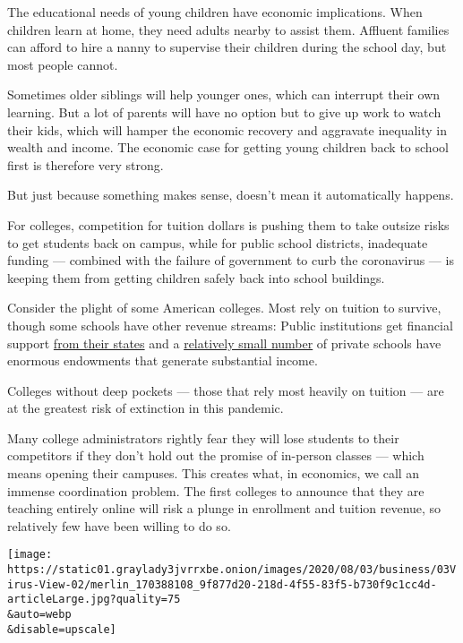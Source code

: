 The educational needs of young children have economic implications. When
children learn at home, they need adults nearby to assist them. Affluent
families can afford to hire a nanny to supervise their children during
the school day, but most people cannot.

Sometimes older siblings will help younger ones, which can interrupt
their own learning. But a lot of parents will have no option but to give
up work to watch their kids, which will hamper the economic recovery and
aggravate inequality in wealth and income. The economic case for getting
young children back to school first is therefore very strong.

But just because something makes sense, doesn't mean it automatically
happens.

For colleges, competition for tuition dollars is pushing them to take
outsize risks to get students back on campus, while for public school
districts, inadequate funding --- combined with the failure of
government to curb the coronavirus --- is keeping them from getting
children safely back into school buildings.

Consider the plight of some American colleges. Most rely on tuition to
survive, though some schools have other revenue streams: Public
institutions get financial support
\href{https://research.collegeboard.org/trends/college-pricing/figures-tables/total-and-student-state-and-local-funding-and-public-enrollment-over-time}{from
their states} and a
\href{https://research.collegeboard.org/pdf/2019-trendsincp-fig-19.pdf}{relatively
small number} of private schools have enormous endowments that generate
substantial income.

Colleges without deep pockets --- those that rely most heavily on
tuition --- are at the greatest risk of extinction in this pandemic.

Many college administrators rightly fear they will lose students to
their competitors if they don't hold out the promise of in-person
classes --- which means opening their campuses. This creates what, in
economics, we call an immense coordination problem. The first colleges
to announce that they are teaching entirely online will risk a plunge in
enrollment and tuition revenue, so relatively few have been willing to
do so.

\texttt{[image: https://static01.graylady3jvrrxbe.onion/images/2020/08/03/business/03Virus-View-02/merlin\_170388108\_9f877d20-218d-4f55-83f5-b730f9c1cc4d-articleLarge.jpg?quality=75\\\&auto=webp\\\&disable=upscale]}

